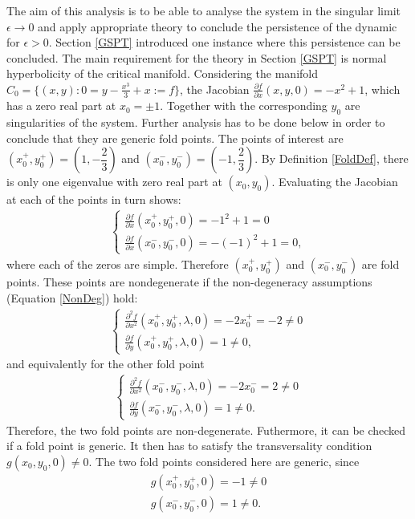 The aim of this analysis is to be able to analyse the system in the singular limit $\epsilon \to 0$ and apply appropriate theory to conclude the persistence of the dynamic for $\epsilon > 0$. 
Section \ref{GSPT} introduced one instance where this persistence can be concluded.
The main requirement for the theory in Section \ref{GSPT} is normal hyperbolicity of the critical manifold.
Considering the manifold $C_0= \{ (x,y) : 0=y-\frac{x^3}{3}+x:=f \}$, the Jacobian $\frac{ \partial f}{\partial x}(x,y,0) = -x^2 + 1$, which has a zero real part at $x_0= \pm 1$. Together with the corresponding $y_0$ are singularities of the system.
Further analysis has to be done below in order to conclude that they are generic fold points.
The points of interest are $(x_0^+,y_0^+)=(1,-\dfrac{2}{3})$ and $(x_0^-,y_0^-)=(-1,\dfrac{2}{3})$. By Definition \ref{FoldDef}, there is only one eigenvalue with zero real part at $(x_0,y_0)$. Evaluating the Jacobian at each of the points in turn shows:
\begin{align*}
\begin{cases}
\frac{ \partial f}{\partial x}(x_0^+,y_0^+,0) = -1^2 + 1 =0 \\
\frac{ \partial f}{\partial x}(x_0^-,y_0^-,0) = -(-1)^2 + 1 =0,
\end{cases}
\end{align*}
where each of the zeros are simple.
Therefore $(x_0^+,y_0^+)$ and $(x_0^-,y_0^-)$ are fold points.
These points are nondegenerate if the non-degeneracy assumptions (Equation \ref{NonDeg}) hold:
\begin{align*}
\begin{cases}
\frac{ \partial ^2 f}{ \partial x^2} (x_0^+,y_0^+, \lambda, 0) = -2 x_0^+ = -2 \neq 0 \\
\frac{\partial f}{\partial y}(x_0^+,y_0^+, \lambda, 0) = 1 \neq 0,
\end{cases}
\end{align*}
and equivalently for the other fold point
\begin{align*}
\begin{cases}
\frac{ \partial ^2 f}{ \partial x^2} (x_0^-,y_0^-, \lambda, 0) = -2 x_0^- = 2 \neq 0 \\
\frac{\partial f}{\partial y}(x_0^-,y_0^-, \lambda, 0) = 1 \neq 0.
\end{cases}
\end{align*}
Therefore, the two fold points are non-degenerate.
Futhermore, it can be checked if a fold point is generic. It then has to satisfy the transversality condition $g(x_0,y_0,0) \neq 0$.
The two fold points considered here are generic, since 
\begin{align*}
g(x_0^+,y_0^+,0)= -1 \neq 0 \\
g(x_0^-,y_0^-,0)= 1 \neq 0.
\end{align*}

